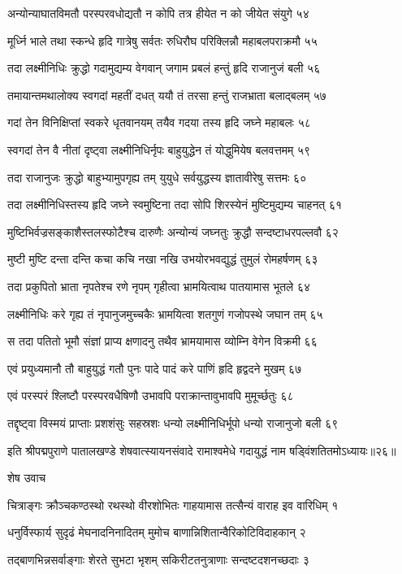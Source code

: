 अन्योन्याघातविमतौ परस्परवधोद्यतौ
न कोपि तत्र हीयेत न को जीयेत संयुगे ५४

मूर्ध्नि भाले तथा स्कन्धे हृदि गात्रेषु सर्वतः
रुधिरौघ परिक्लिन्नौ महाबलपराक्रमौ ५५

तदा लक्ष्मीनिधिः क्रुद्धो गदामुद्यम्य वेगवान्
जगाम प्रबलं हन्तुं हृदि राजानुजं बली ५६

तमायान्तमथालोक्य स्वगदां महतीं दधत्
ययौ तं तरसा हन्तुं राजभ्राता बलाद्बलम् ५७

गदां तेन विनिक्षिप्तां स्वकरे धृतवानयम्
तयैव गदया तस्य हृदि जघ्ने महाबलः ५८

स्वगदां तेन वै नीतां दृष्ट्वा लक्ष्मीनिधिर्नृपः
बाहुयुद्धेन तं योद्धुमियेष बलवत्तमम् ५९

तदा राजानुजः क्रुद्धो बाहुभ्यामुपगृह्य तम्
युयुधे सर्वयुद्धस्य ज्ञातावीरेषु सत्तमः ६०

तदा लक्ष्मीनिधिस्तस्य हृदि जघ्ने स्वमुष्टिना
तदा सोपि शिरस्येनं मुष्टिमुद्यम्य चाहनत् ६१

मुष्टिभिर्वज्रसङ्काशैस्तलस्फोटैश्च दारुणैः
अन्योन्यं जघ्नतुः क्रुद्धौ सन्दष्टाधरपल्लवौ ६२

मुष्टी मुष्टि दन्ता दन्ति कचा कचि नखा नखि
उभयोरभवद्युद्धं तुमुलं रोमहर्षणम् ६३

तदा प्रकुपितो भ्राता नृपतेश्च रणे नृपम्
गृहीत्वा भ्रामयित्वाथ पातयामास भूतले ६४

लक्ष्मीनिधिः करे गृह्य तं नृपानुजमुच्चकैः
भ्रामयित्वा शतगुणं गजोपस्थे जघान तम् ६५

स तदा पतितो भूमौ संज्ञां प्राप्य क्षणादनु
तथैव भ्रामयामास व्योम्नि वेगेन विक्रमी ६६

एवं प्रयुध्यमानौ तौ बाहुयुद्धं गतौ पुनः
पादे पादं करे पाणिं हृदि हृद्वदने मुखम् ६७

एवं परस्परं श्लिष्टौ परस्परवधैषिणौ
उभावपि पराक्रान्तावुभावपि मुमूर्च्छतुः ६८

तद्दृष्ट्वा विस्मयं प्राप्ताः प्रशशंसुः सहस्रशः
धन्यो लक्ष्मीनिधिर्भूपो धन्यो राजानुजो बली ६९

इति श्रीपद्मपुराणे पातालखण्डे शेषवात्स्यायनसंवादे रामाश्वमेधे गदायुद्धं नाम षड्विंशतितमोऽध्यायः॥२६॥


शेष उवाच

चित्राङ्गः क्रौञ्चकण्ठस्थो रथस्थो वीरशोभितः
गाहयामास तत्सैन्यं वाराह इव वारिधिम् १

धनुर्विस्फार्य सुदृढं मेघनादनिनादितम्
मुमोच बाणान्निशितान्वैरिकोटिविदाहकान् २

तद्बाणभिन्नसर्वाङ्गाः शेरते सुभटा भृशम्
सकिरीटतनुत्राणाः सन्दष्टदशनच्छदाः ३

